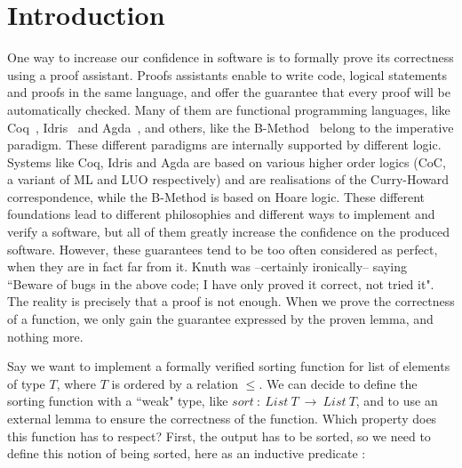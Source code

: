 \section{Introduction}


One way to increase our confidence in software is to formally prove its correctness using a proof assistant. Proofs assistants enable to write code, logical statements and proofs in the same language, and offer the guarantee that every proof will be automatically checked. Many of them are functional programming languages, like Coq~\cite{Bertot2004}, Idris~\cite{brady2013idris} and Agda~\cite{Norell2008}, and others, like the B-Method~\cite{Abrial1991} belong to the imperative paradigm. These different paradigms are internally supported by different logic. Systems like Coq, Idris and Agda are based on various higher order logics (CoC, a variant of ML and LUO respectively) and are realisations of the Curry-Howard correspondence, while the B-Method is based on Hoare logic. These different foundations lead to different philosophies and different ways to implement and verify a software, but all of them greatly increase the confidence on the produced software. However, these guarantees tend to be too often considered as perfect, when they are in fact far from it. Knuth was --certainly ironically-- saying ``Beware of bugs in the above code; I have only proved it correct, not tried it". The reality is precisely that a proof is not enough. When we prove the correctness of a function, we only gain the guarantee expressed by the proven lemma, and nothing more. 

Say we want to implement a formally verified sorting function for list of elements of type $T$, where $T$ is ordered by a relation $\leq$.
We can decide to define the sorting function with a ``weak" type, like $sort\ :\ List\ T\ \rightarrow\ List\ T$, and to use an external lemma to ensure the correctness of the function. Which property does this function has to respect? First, the output has to be sorted, so we need to define this notion of being sorted, here as an inductive predicate :


